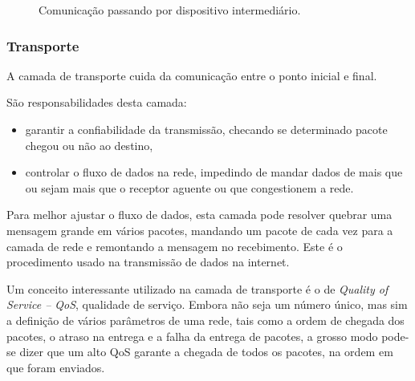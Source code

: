 \begin{figure}[hbt]
\begin{center}
	\end{center}
	\caption{Comunicação passando por dispositivo intermediário.}
	\label{fig:camada_rede}
\end{figure}

\subsubsection{Transporte}
 A camada de transporte cuida da comunicação entre o ponto inicial e final.

 São responsabilidades desta camada:
 \begin{itemize}
	 \item garantir a confiabilidade da transmissão, checando se determinado pacote chegou ou não ao destino,
	 \item controlar o fluxo de dados na rede, impedindo de mandar dados de mais que ou sejam mais que o receptor aguente ou que congestionem a rede.
 \end{itemize}
 
 Para melhor ajustar o fluxo de dados, esta camada pode resolver quebrar uma mensagem grande em vários pacotes, mandando um pacote de cada vez para a camada de rede e remontando a mensagem no recebimento. Este é o procedimento usado na transmissão de dados na internet.

 Um conceito interessante utilizado na camada de transporte é o de \emph{Quality of Service -- QoS}, qualidade de serviço. Embora não seja um número único, mas sim a definição de vários parâmetros de uma rede, tais como a ordem de chegada dos pacotes, o atraso na entrega e a falha da entrega de pacotes, a grosso modo pode-se dizer que um alto QoS garante a chegada de todos os pacotes, na ordem em que foram enviados.

